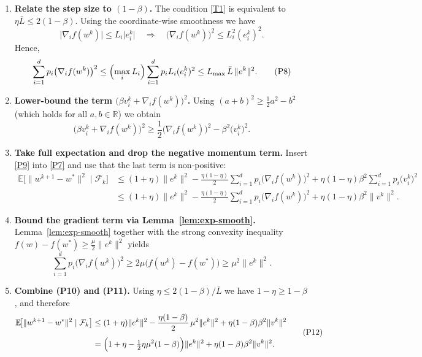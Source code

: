 \documentclass{article}
\newcommand{\E}{\mathbb{E}}
\newcommand{\R}{\mathbb{R}}
\begin{document}
\begin{enumerate}[label=[Step \arabic*], leftmargin=*]
\item \textbf{Relate the step size to $(1-\beta)$.}  
The condition \eqref{T1} is equivalent to $\eta\bar L\le 2(1-\beta)$.  
Using the coordinate‑wise smoothness we have
\[
\bigl|\nabla_i f(w^{k})\bigr|
\le L_i\bigl|e^{k}_{i}\bigr|
\quad\Longrightarrow\quad
\bigl(\nabla_i f(w^{k})\bigr)^{2}\le L_i^{2}(e^{k}_{i})^{2}.
\]
Hence,
\[
\sum_{i=1}^{d}p_i\bigl(\nabla_i f(w^{k})\bigr)^{2}
\le \Bigl(\max_i L_i\Bigr)\sum_{i=1}^{d}p_i L_i(e^{k}_{i})^{2}
\le L_{\max}\,\bar L\,\|e^{k}\|^{2}.
\tag{P8}
\]

\item \textbf{Lower‑bound the term $\bigl(\beta v_{i}^{k}+ \nabla_i f(w^{k})\bigr)^{2}$.}  
Using $(a+b)^{2}\ge \tfrac12 a^{2}-b^{2}$ (which holds for all $a,b\in\R$) we obtain
\[
\bigl(\beta v_{i}^{k}+ \nabla_i f(w^{k})\bigr)^{2}
\ge \frac12\bigl(\nabla_i f(w^{k})\bigr)^{2}
      -\beta^{2}\bigl(v_{i}^{k}\bigr)^{2}.
\tag{P9}
\]

\item \textbf{Take full expectation and drop the negative momentum term.}  
Insert \eqref{P9} into \eqref{P7} and use that the last term is non‑positive:
\[
\begin{aligned}
\E\!\bigl[\|w^{k+1}-w^{*}\|^{2}\mid\mathcal{F}_{k}\bigr]
&\le (1+\eta)\|e^{k}\|^{2}
-\frac{\eta(1-\eta)}{2}\sum_{i=1}^{d}p_i
      \bigl(\nabla_i f(w^{k})\bigr)^{2}
   +\eta(1-\eta)\beta^{2}\sum_{i=1}^{d}p_i\bigl(v_{i}^{k}\bigr)^{2}\\
&\le (1+\eta)\|e^{k}\|^{2}
-\frac{\eta(1-\eta)}{2}\sum_{i=1}^{d}p_i
      \bigl(\nabla_i f(w^{k})\bigr)^{2}
   +\eta(1-\eta)\beta^{2}\|v^{k}\|^{2}.
\end{aligned}
\tag{P10}
\]

\item \textbf{Bound the gradient term via Lemma~\ref{lem:exp-smooth}.}  
Lemma~\ref{lem:exp-smooth} together with the strong convexity inequality
$f(w)-f(w^{*})\ge \tfrac{\mu}{2}\|e^{k}\|^{2}$ yields
\[
\sum_{i=1}^{d}p_i\bigl(\nabla_i f(w^{k})\bigr)^{2}
\ge 2\mu\bigl(f(w^{k})-f(w^{*})\bigr)
\ge \mu^{2}\|e^{k}\|^{2}.
\tag{P11}
\]

\item \textbf{Combine (P10) and (P11).}  
Using $\eta\le 2(1-\beta)/\bar L$ we have $1-\eta\ge 1-\beta$, and therefore
\[
\begin{aligned}
\E\!\bigl[\|w^{k+1}-w^{*}\|^{2}\mid\mathcal{F}_{k}\bigr]
&\le (1+\eta)\|e^{k}\|^{2}
-\frac{\eta(1-\beta)}{2}\,\mu^{2}\|e^{k}\|^{2}
   +\eta(1-\beta)\beta^{2}\|v^{k}\|^{2}\\[4pt]
&= \Bigl(1+\eta-\tfrac12\eta\mu^{2}(1-\beta)\Bigr)\|e^{k}\|^{2}
   +\eta(1-\beta)\beta^{2}\|v^{k}\|^{2}.
\end{aligned}
\tag{P12}
\]


\end{enumerate}
\end{document}
